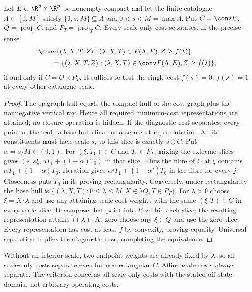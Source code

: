 \begin{proposition}\label{prop:scale-rectangularity}
Let $E\subset\R^d\times\R^p$ be nonempty compact and let the finite
catalogue $\Lambda\subset[0,M]$ satisfy $\{0,s,M\}\subseteq\Lambda$
and $0<s<M=\max\Lambda$. Put $C=\conv E$,
$Q=\operatorname{proj}_\xi C$, and $P_T=\operatorname{proj}_T C$.
Every scale-only cost separates, in the precise sense
\begin{equation}\label{eq:scale-cost-separation}
 \begin{split}
 &\conv\{(\lambda,X,T,Z):(\lambda,X,T)\in F(\Lambda,E),Z\ge f(\lambda)\}\\
 &\qquad=\{(\lambda,X,T,Z):(\lambda,X,T)\in\conv F(\Lambda,E),
                         Z\ge\check f(\lambda)\},
 \end{split}
\end{equation}
if and only if $C=Q\times P_T$. It suffices to test the single cost
$f(s)=0$, $f(\lambda)=1$ at every other catalogue scale.
\end{proposition}
\begin{proof}
The epigraph hull equals the compact hull of the cost graph plus the
nonnegative vertical ray. Hence all required minimum-cost representations
are attained; no closure operation is hidden. If the diagnostic cost
separates, every point of the scale-$s$ base-hull slice has a zero-cost
representation. All its constituents must have scale $s$, so this slice
is exactly $s\odot C$. Put $\alpha=s/M\in(0,1)$. For
$(\xi,T_1)\in C$ and $T_0\in P_T$, mixing the extreme slices gives
$(s,s\xi,\alpha T_1+(1-\alpha)T_0)$ in that slice. Thus the fibre of
$C$ at $\xi$ contains $\alpha T_1+(1-\alpha)T_0$. Iteration gives
$\alpha^jT_1+(1-\alpha^j)T_0$ in the fibre for every $j$. Closedness
puts $T_0$ in it, proving rectangularity.
Conversely, under rectangularity the base hull is
$\{(\lambda,X,T):0\le\lambda\le M,X\in\lambda Q,T\in P_T\}$.
For $\lambda>0$ choose $\xi=X/\lambda$ and use any attaining scale-cost
weights with the same $(\xi,T)\in C$ in every scale slice. Decompose
that point into $E$ within each slice; the resulting representation
attains $\check f(\lambda)$. At zero choose any $\xi\in Q$ and use
the zero slice. Every representation has cost at least $\check f$ by
convexity, proving equality. Universal separation implies the diagnostic
case, completing the equivalence.
\end{proof}
Without an interior scale, two endpoint weights are already fixed by
$\lambda$, so all scale-only costs separate even for nonrectangular $C$.
Affine scale costs always separate. The criterion concerns all scale-only
costs with the stated off-state domain, not arbitrary operating costs.

